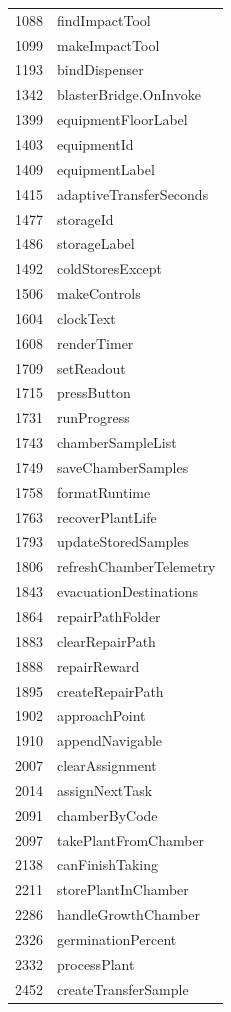 \begin{longtable}{p{}p{}}
1088 & findImpactTool \\
1099 & makeImpactTool \\
1193 & bindDispenser \\
1342 & blasterBridge.\allowbreak{}OnInvoke \\
1399 & equipmentFloorLabel \\
1403 & equipmentId \\
1409 & equipmentLabel \\
1415 & adaptiveTransferSeconds \\
1477 & storageId \\
1486 & storageLabel \\
1492 & coldStoresExcept \\
1506 & makeControls \\
1604 & clockText \\
1608 & renderTimer \\
1709 & setReadout \\
1715 & pressButton \\
1731 & runProgress \\
1743 & chamberSampleList \\
1749 & saveChamberSamples \\
1758 & formatRuntime \\
1763 & recoverPlantLife \\
1793 & updateStoredSamples \\
1806 & refreshChamberTelemetry \\
1843 & evacuationDestinations \\
1864 & repairPathFolder \\
1883 & clearRepairPath \\
1888 & repairReward \\
1895 & createRepairPath \\
1902 & approachPoint \\
1910 & appendNavigable \\
2007 & clearAssignment \\
2014 & assignNextTask \\
2091 & chamberByCode \\
2097 & takePlantFromChamber \\
2138 & canFinishTaking \\
2211 & storePlantInChamber \\
2286 & handleGrowthChamber \\
2326 & germinationPercent \\
2332 & processPlant \\
2452 & createTransferSample \\

\end{longtable}
